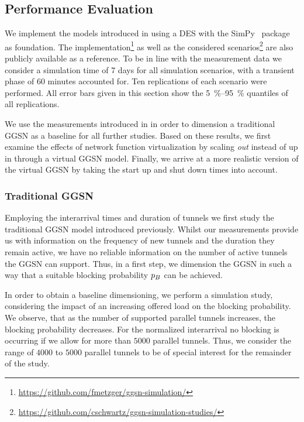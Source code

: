 \subsection{Performance Evaluation}\label{sec:cloud:virtualized_network_functions:performance_evaluation}

We implement the models introduced in  using a \gls{DES} with the SimPy~\cite{SimPy2015} package as foundation.
The implementation\footnote{\url{https://github.com/fmetzger/ggsn-simulation/}} as well as the considered scenarios\footnote{\url{https://github.com/cschwartz/ggsn-simulation-studies/}} are also publicly available as a reference.
To be in line with the measurement data we consider a simulation time of 7 days for all simulation scenarios, with a transient phase of 60 minutes accounted for.
Ten replications of each scenario were performed.
All error bars given in this section show the \SIrange{5}{95}{\percent} quantiles of all replications.

We use the measurements introduced in  in order to dimension a traditional \gls{GGSN} as a baseline for all further studies.
Based on these results, we first examine the effects of network function virtualization by scaling \emph{out} instead of up in through a virtual \gls{GGSN} model.
Finally, we arrive at a more realistic version of the virtual \gls{GGSN} by taking the start up and shut down times into account.

\subsubsection*{Traditional GGSN}\label{sec:cloud:virtualized_network_functions:performance_evaluation:traditional_ggsn}

Employing the interarrival times and duration of tunnels we first study the traditional \gls{GGSN} model introduced previously.
Whilst our measurements provide us with information on the frequency of new tunnels and the duration they remain active, we have no reliable information on the number of active tunnels the \gls{GGSN} can support.
Thus, in a first step, we dimension the \gls{GGSN} in such a way that a suitable blocking probability \(p_B\) can be achieved.


In order to obtain a baseline dimensioning, we perform a simulation study, considering the impact of an increasing offered load on the blocking probability.
We observe, that as the number of supported parallel tunnels increases, the blocking probability decreases.
For the normalized interarrival no blocking is occurring if we allow for more than \(5000\) parallel tunnels.
Thus, we consider the range of \(4000\) to \(5000\) parallel tunnels to be of special interest for the remainder of the study.

